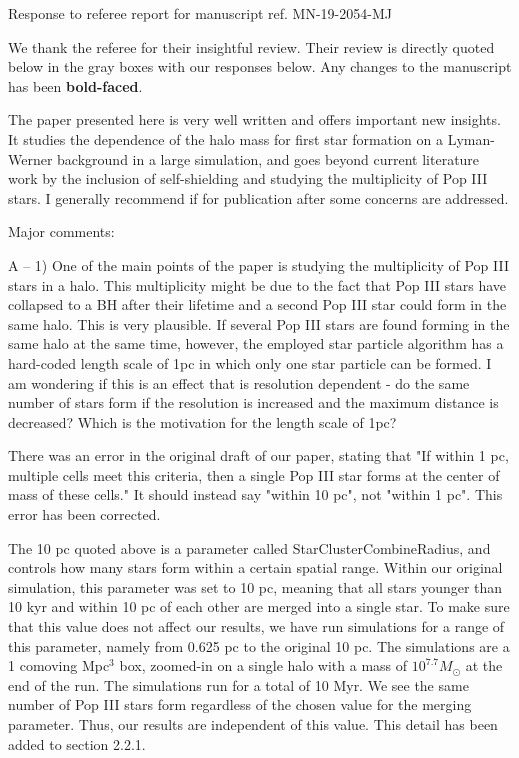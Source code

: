 \documentclass[11pt]{article}
\newenvironment{referee}[1][]{%
    \ignorespaces%
    \begin{mdframed}[style=myquotestyle,#1]%
}{%
    \end{mdframed}%
    \ignorespacesafterend%
}%
\begin{document}
\begin{center} 
\bfseries{
\begin{large}
  Response to referee report for manuscript ref. MN-19-2054-MJ
\end{large}
}
\end{center}

We thank the referee for their insightful review.  Their review is directly quoted below in the gray boxes with our responses below.  Any changes to the manuscript has been \textbf{bold-faced}.

\begin{referee}
The paper presented here is very well written and offers important new insights.  It studies the dependence of the halo mass for first star formation on a Lyman-Werner background in a large simulation, and goes beyond current literature work by the inclusion of self-shielding and studying the multiplicity of Pop III stars. I generally recommend if for publication after some concerns are addressed.
\end{referee}


\begin{referee}
Major comments:

A -- 1) One of the main points of the paper is studying the multiplicity of Pop III stars in a halo. This multiplicity might be due to the fact that Pop III stars have collapsed to a BH after their lifetime and a second Pop III star could form in the same halo. This is very plausible. If several Pop III stars are found forming in the same halo at the same time, however, the employed star particle algorithm has a hard-coded length scale of 1pc in which only one star particle can be formed. I am wondering if this is an effect that is resolution dependent - do the same number of stars form if the resolution is increased and the maximum distance is decreased? Which is the motivation for the length scale of 1pc?
\end{referee}

There was an error in the original draft of our paper, stating that "If within 1 pc, multiple cells meet this criteria, then a single Pop III star forms at the center of mass of these cells." It should instead say "within 10 pc", not "within 1 pc". This error has been corrected.

The 10 pc quoted above is a parameter called StarClusterCombineRadius, and controls how many stars form within a certain spatial range. Within our original simulation, this parameter was set to 10 pc, meaning that all stars younger than 10 kyr and within 10 pc of each other are merged into a single star. To make sure that this value does not affect our results, we have run simulations for a range of this parameter, namely from 0.625 pc to the original 10 pc. The simulations are a 1 comoving Mpc$^3$ box, zoomed-in on a single halo with a mass of $10^{7.7} M_{\odot}$ at the end of the run. The simulations run for a total of 10 Myr. We see the same number of Pop III stars form regardless of the chosen value for the merging parameter. Thus, our results are independent of this value. This detail has been added to section 2.2.1.
\end{document}
